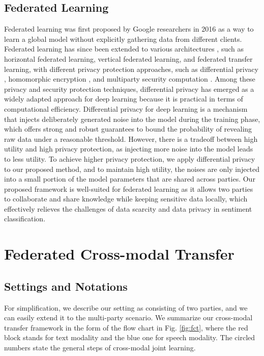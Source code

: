 \documentclass[11pt]{article}
\begin{document}
\subsection{Federated Learning}
Federated learning was first proposed by Google researchers in 2016 \cite{mcmahan2016communication} as a way to learn a global model without explicitly gathering data from different clients. Federated learning has since been extended to various architectures \cite{yang2019federated,yang2020federated}, such as horizontal federated learning, vertical federated learning, and federated transfer learning, with different privacy protection approaches, such as differential privacy \cite{dwork2006calibrating}, homomorphic encryption \cite{rivest1978data}, and multiparty security computation \cite{yao1982protocols}. Among these privacy and security protection techniques, differential privacy has emerged as a widely adapted approach for deep learning because it is practical in terms of computational efficiency. Differential privacy for deep learning is a mechanism that injects deliberately generated noise into the model during the training phase, which offers strong and robust guarantees to bound the probability of revealing raw data under a reasonable threshold. However, there is a tradeoff between high utility and high privacy protection, as injecting more noise into the model leads to less utility. To achieve higher privacy protection, we apply differential privacy to our proposed method, and to maintain high utility, the noises are only injected into a small portion of the model parameters that are shared across parties. Our proposed framework is well-suited for federated learning as it allows two parties to collaborate and share knowledge while keeping sensitive data locally, which effectively relieves the challenges of data scarcity and data privacy in sentiment classification.
\section{Federated Cross-modal Transfer}


\subsection{Settings and Notations}
\label{sec:settings and notations}

For simplification, we describe our setting as consisting of two parties, and we can easily extend it to the multi-party scenario. We summarize our cross-modal transfer framework in the form of the flow chart in Fig. \ref{fig:fct}, where the red block stands for text modality and the blue one for speech modality. The circled numbers state the general steps of cross-modal joint learning.
\end{document}
